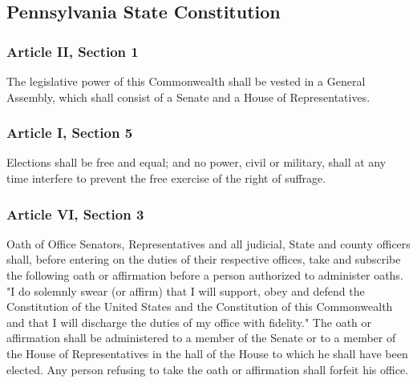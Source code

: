 \documentclass[11pt]{article} %
\begin{document}
\begin{enumerate}
\subsection{Pennsylvania State Constitution}
\subsubsection{Article II, Section 1}
\label{sec:ArticleIISection1PA}
The legislative power of this Commonwealth shall be vested in a General Assembly, which shall consist of a Senate and a House of Representatives. 

\subsubsection{ Article I, Section 5}
\label{sec:ArticleISection5PA}
  Elections shall be free and equal; and no power, civil or military, shall at any time interfere to prevent the free exercise of the right of suffrage.

\subsubsection{ Article VI, Section 3}
\label{sec:ArticleVISection3PA}
 Oath of Office  Senators, Representatives and all judicial, State and county officers shall, before entering on the duties of their respective offices, take and subscribe the following oath or affirmation before a person authorized to administer oaths. "I do solemnly swear (or affirm) that I will support, obey and defend the Constitution of the United States and the Constitution of this Commonwealth and that I will discharge the duties of my office with fidelity." The oath or affirmation shall be administered to a member of the Senate or to a member of the House of Representatives in the hall of the House to which he shall have been elected. Any person refusing to take the oath or affirmation shall forfeit his office. 

\end{enumerate}
\end{document}
